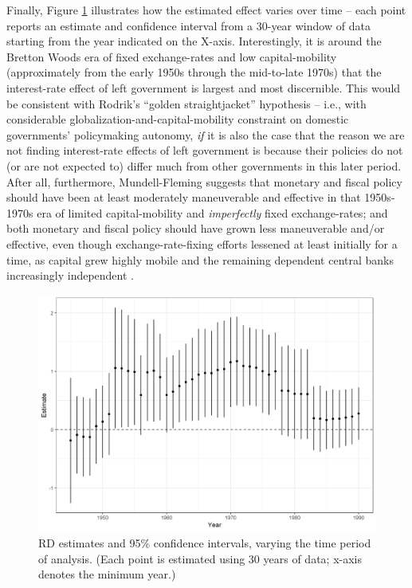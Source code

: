 \documentclass[12pt]{article}
\begin{document}
Finally, Figure \ref{fig:rdEstimateVaryingYear} illustrates how the estimated effect varies over time -- each point reports an estimate and confidence interval from a 30-year window of data starting from the year indicated on the X-axis. Interestingly, it is around the Bretton Woods era of fixed exchange-rates and low capital-mobility (approximately from the early 1950s through the mid-to-late 1970s) that the interest-rate effect of left government is largest and most discernible. This would be consistent with Rodrik's ``golden straightjacket'' hypothesis -- i.e., with considerable globalization-and-capital-mobility constraint on domestic governments' policymaking autonomy, \textit{if} it is also the case that the reason we are not finding interest-rate effects of left government is because their policies do not (or are not expected to) differ much from other governments in this later period. After all, furthermore, Mundell-Fleming suggests that monetary and fiscal policy should have been at least moderately maneuverable and effective in that 1950s-1970s era of limited capital-mobility and \textit{imperfectly} fixed exchange-rates; and both monetary and fiscal policy should have grown less maneuverable and/or effective, even though exchange-rate-fixing efforts lessened at least initially for a time, as capital grew highly mobile and the remaining dependent central banks increasingly independent \citep{Clark2003, Franzese2003}.

\begin{figure}
\centering
\includegraphics[width=\linewidth]{Figures/rdEstimateVaryingYear}
\caption{RD estimates and 95\% confidence intervals, varying the time period of analysis. (Each point is estimated using 30 years of data; x-axis denotes the minimum year.)}
\label{fig:rdEstimateVaryingYear}
\end{figure}
\end{document}
